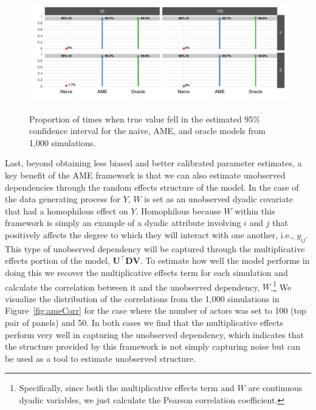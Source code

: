 \begin{figure}
	\centering
	\caption{Proportion of times when true value fell in the estimated 95\% confidence interval for the naive, AME, and oracle models from 1,000 simulations.}
	\label{fig:ameCalib}
	\includegraphics[width=1\textwidth]{ameSimCover_all.pdf} \\
\end{figure}

Last, beyond obtaining less biased and better calibrated parameter estimates, a key benefit of the AME framework is that we can also estimate unobserved dependencies through the random effects structure of the model. In the case of the data generating process for $Y$, $W$ is set as an unobserved dyadic covariate that had a homophilous effect on $Y$. Homophilous because $W$ within this framework is simply an example of a dyadic attribute involving $i$ and $j$ that positively affects the degree to which they will interact with one another, i.e., $y_{ij}$. This type of unobserved dependency will be captured through the multiplicative effects portion of the model, $\textbf{U}^{\top} \textbf{D} \textbf{V}$. To estimate how well the model performs in doing this we recover the multiplicative effects term for each simulation and calculate the correlation between it and the unobserved dependency, $W$.\footnote{Specifically, since both the multiplicative effects term and $W$ are continuous dyadic variables, we just calculate the Pearson correlation coefficient.} We visualize the distribution of the correlations from the 1,000 simulations in Figure~\ref{fig:ameCorr} for the case where the number of actors was set to 100 (top pair of panels) and 50. In both cases we find that the multiplicative effects perform very well in capturing the unobserved dependency, which indicates that the structure provided by this framework is not simply capturing noise but can be used as a tool to estimate unobserved structure. 

